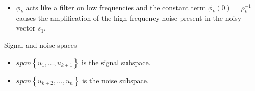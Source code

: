 \documentclass{beamer}
\begin{document}
\begin{frame}
  \begin{center}
  \end{center}
  \begin{itemize}
    \item $\phi_{k}$ acts like a filter on low frequencies and the constant term
      $\phi_{k}(0) = \rho_{k}^{-1}$ causes the amplification of the high
      frequency noise present in the noisy vector $s_{1}$.
  \end{itemize}
\end{frame}

\begin{frame}{Signal and noise spaces}
  \begin{center}
  \end{center}
  \begin{itemize}
    \item $span\left\{u_{1},\ldots,u_{k+1}\right\}$ is the signal subspace.
    \item $span\left\{u_{k+2},\ldots,u_{n}\right\}$ is the noise subspace.
  \end{itemize}
\end{frame}
\end{document}
